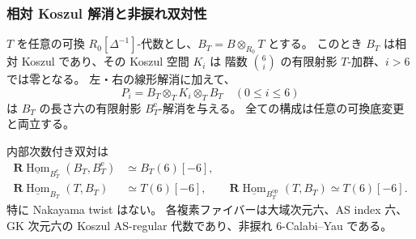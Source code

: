\subsubsection{相対 Koszul 解消と非捩れ双対性}

\begin{theorem}
\label{ifb:thm:regularity}
$T$ を任意の可換 $R_0[\Delta^{-1}]$-代数とし、$B_T=B\otimes_{R_0}T$ とする。
このとき $B_T$ は相対 Koszul であり、その Koszul 空間 $K_i$ は
階数 $\binom6i$ の有限射影 $T$-加群、$i>6$ では零となる。
左・右の線形解消に加えて、
\[
       P_i=B_T\otimes_TK_i\otimes_TB_T\quad(0\le i\le6)
\]
は $B_T$ の長さ六の有限射影 $B_T^{\mathrm e}$-解消を与える。
全ての構成は任意の可換底変更と両立する。

内部次数付き双対は
\begin{align}
 \mathbf R\underline{\operatorname{Hom}}_{B_T^{\mathrm e}}
             (B_T,B_T^{\mathrm e})&\simeq B_T(6)[-6],
                    \label{ifb:eq:bimodule-duality}\\
 \mathbf R\underline{\operatorname{Hom}}_{B_T}(T,B_T)
   &\simeq T(6)[-6],\qquad
 \mathbf R\underline{\operatorname{Hom}}_{B_T^{\mathrm{op}}}(T,B_T)
       \simeq T(6)[-6].\label{ifb:eq:augmentation-duality}
\end{align}
特に Nakayama twist はない。
各複素ファイバーは大域次元六、AS index 六、GK 次元六の
Koszul AS-regular 代数であり、非捩れ $6$-Calabi--Yau である。
\end{theorem}


